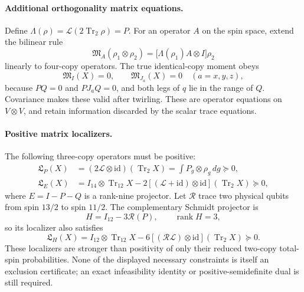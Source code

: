 \documentclass{article}
\newcommand{\Tr}{\operatorname{Tr}}
\begin{document}
\paragraph{Additional orthogonality matrix equations.}
Define $\Lambda(\rho)=\mathcal L(2\Tr_2\rho)=P$. For an operator $A$ on the spin space, extend the bilinear rule
\[
 \mathfrak M_A(\rho_1\otimes\rho_2)
 =\bigl[\Lambda(\rho_1)A\otimes I\bigr]\rho_2
\]
linearly to four-copy operators. The true identical-copy moment obeys
\[
 \mathfrak M_I(X)=0,\qquad
 \mathfrak M_{J_a}(X)=0\quad(a=x,y,z),
\]
because $PQ=0$ and $PJ_aQ=0$, and both legs of $q$ lie in the range of $Q$. Covariance makes these valid after twirling. These are operator equations on $V\otimes V$, and retain information discarded by the scalar trace equations.

\paragraph{Positive matrix localizers.}
The following three-copy operators must be positive:
\begin{align*}
 \mathfrak L_P(X)&=(2\mathcal L\otimes\mathrm{id})(\Tr_2X)
 =\int P_g\otimes\rho_g\,dg\succeq0,\\
 \mathfrak L_E(X)&=I_{14}\otimes\Tr_{12}X
 -2[(\mathcal L+\mathrm{id})\otimes\mathrm{id}](\Tr_2X)\succeq0,
\end{align*}
where $E=I-P-Q$ is a rank-nine projector. Let $\mathcal R$ trace two physical qubits from spin $13/2$ to spin $11/2$. The complementary Schmidt projector is
\[
 H=I_{12}-3\mathcal R(P),\qquad \operatorname{rank}H=3,
\]
so its localizer also satisfies
\[
 \mathfrak L_H(X)=I_{12}\otimes\Tr_{12}X
 -6[(\mathcal R\mathcal L)\otimes\mathrm{id}](\Tr_2X)\succeq0.
\]
These localizers are stronger than positivity of only their reduced two-copy total-spin probabilities. None of the displayed necessary constraints is itself an exclusion certificate; an exact infeasibility identity or positive-semidefinite dual is still required.
\end{document}
